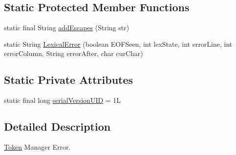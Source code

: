 \subsection*{Static Protected Member Functions}
\begin{DoxyCompactItemize}
\item 
static final String \hyperlink{classuk_1_1ac_1_1manchester_1_1cs_1_1owl_1_1owlapi_1_1turtle_1_1parser_1_1_token_mgr_error_a2896b048f6647d8381221afd248ff0be}{add\-Escapes} (String str)
\item 
static String \hyperlink{classuk_1_1ac_1_1manchester_1_1cs_1_1owl_1_1owlapi_1_1turtle_1_1parser_1_1_token_mgr_error_af5e38310c33a3d74fab4e0de7d795132}{Lexical\-Error} (boolean E\-O\-F\-Seen, int lex\-State, int error\-Line, int error\-Column, String error\-After, char cur\-Char)
\end{DoxyCompactItemize}
\subsection*{Static Private Attributes}
\begin{DoxyCompactItemize}
\item 
static final long \hyperlink{classuk_1_1ac_1_1manchester_1_1cs_1_1owl_1_1owlapi_1_1turtle_1_1parser_1_1_token_mgr_error_a756cc980f7fdcac9dd0586bb2167b768}{serial\-Version\-U\-I\-D} = 1\-L
\end{DoxyCompactItemize}


\subsection{Detailed Description}
\hyperlink{classuk_1_1ac_1_1manchester_1_1cs_1_1owl_1_1owlapi_1_1turtle_1_1parser_1_1_token}{Token} Manager Error. 

